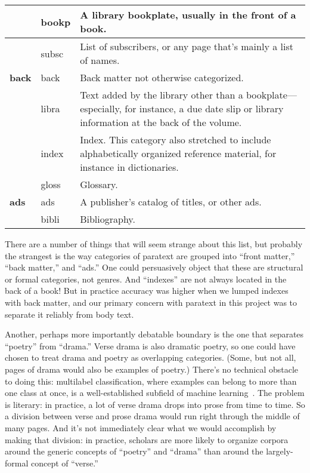 \documentclass[paper=a4, fontsize=12pt]{scrartcl}
\numberwithin{equation}{section}		%
\numberwithin{figure}{section}			%
\numberwithin{table}{section}				%
\begin{document}
\begin{center}
\begin{longtable}{ | l | l | p{10cm} |}
& bookp & A library bookplate, usually in the front of a book.  \\ \hline
& subsc & List of subscribers, or any page that's mainly a list of names.  \\ \hline
\textbf{back} & back & Back matter not otherwise categorized.  \\ \hline
& libra & Text added by the library other than a bookplate---especially, for instance, a due date slip or library information at the back of the volume.  \\ \hline
& index & Index. This category also stretched to include alphabetically organized reference material, for instance in dictionaries. \\ \hline
& gloss & Glossary.  \\ \hline
\textbf{ads} & ads & A publisher's catalog of titles, or other ads.  \\ \hline
& bibli & Bibliography.  \\ \hline
\end{longtable}
\end{center}

There are a number of things that will seem strange about this list, but probably the strangest is the way categories of paratext are grouped into ``front matter,'' ``back matter,'' and ``ads.'' One could persuasively object that these are structural or formal categories, not genres. And ``indexes'' are not always located in the back of a book! But in practice accuracy was higher when we lumped indexes with back matter, and our primary concern with paratext in this project was to separate it reliably from body text.

Another, perhaps more importantly debatable boundary is the one that separates ``poetry'' from ``drama.'' Verse drama is also dramatic poetry, so one could have chosen to treat drama and poetry as overlapping categories. (Some, but not all, pages of drama would also be examples of poetry.) There's no technical obstacle to doing this: multilabel classification, where examples can belong to more than one class at once, is a well-established subfield of machine learning~\cite{tsoumakas:multilabel}. The problem is literary: in practice, a lot of verse drama drops into prose from time to time. So a division between verse and prose drama would run right through the middle of many pages. And it's not immediately clear what we would accomplish by making that division: in practice, scholars are more likely to organize corpora around the generic concepts of ``poetry'' and ``drama'' than around the largely-formal concept of ``verse.''
\end{document}
